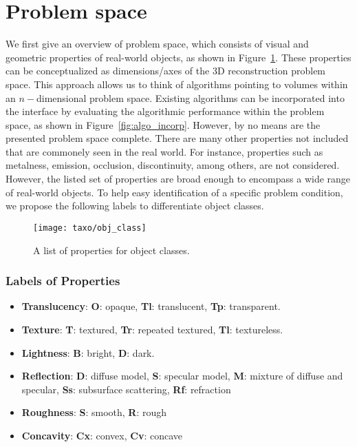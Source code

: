 \section{Problem space}
We first give an overview of problem space, which consists of visual and geometric properties of real-world objects, as shown in Figure~\ref{fig:obj_class}. These properties can be conceptualized as dimensions/axes of the 3D reconstruction problem space. This approach allows us to think of algorithms pointing to volumes within an $n-$dimensional problem space. Existing algorithms can be incorporated into the interface by evaluating the algorithmic performance within the problem space, as shown in Figure~\ref{fig:algo_incorp}. However, by no means are the presented problem space complete. There are many other properties not included that are commonely seen in the real world. For instance, properties such as metalness, emission, occlusion, discontinuity, among others, are not considered. However, the listed set of properties are broad enough to encompass a wide range of real-world objects. To help easy identification of a specific problem condition, we propose the following labels to differentiate object classes.
\begin{figure}[!htbp]
\centering
\texttt{[image: taxo/obj\_class]}\\
\caption{A list of properties for object classes.}
\label{fig:obj_class}
\end{figure}

\subsubsection{Labels of Properties}
\begin{itemize}
\item \textbf{Translucency}: \textbf{O}: opaque, \textbf{Tl}: translucent, \textbf{Tp}: transparent.
\item \textbf{Texture}: \textbf{T}: textured, \textbf{Tr}: repeated textured, \textbf{Tl}: textureless.
\item \textbf{Lightness}: \textbf{B}: bright, \textbf{D}: dark.
\item \textbf{Reflection}: \textbf{D}: diffuse model, \textbf{S}: specular model, \textbf{M}: mixture of diffuse and specular, \textbf{Ss}: subsurface scattering, \textbf{Rf}: refraction
\item \textbf{Roughness}: \textbf{S}: smooth, \textbf{R}: rough
\item \textbf{Concavity}: \textbf{Cx}: convex, \textbf{Cv}: concave
\end{itemize}

